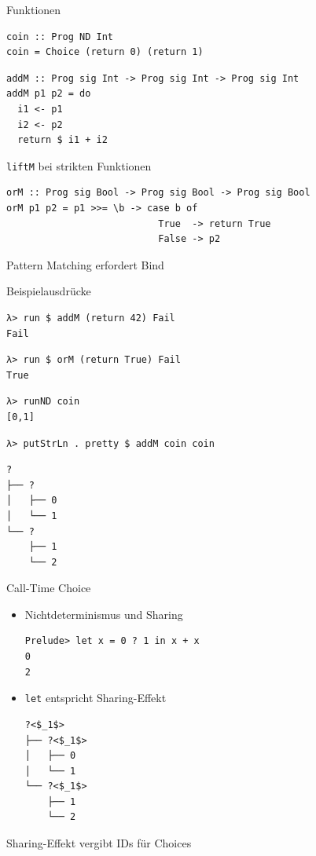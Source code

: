 \documentclass{beamer}
\newcommand{\haskellinline}[1]{\texttt{#1}}
\begin{document}
\begin{frame}[fragile]{Funktionen}
\begin{verbatim}
coin :: Prog ND Int
coin = Choice (return 0) (return 1)
\end{verbatim}
\pause
\begin{verbatim}
addM :: Prog sig Int -> Prog sig Int -> Prog sig Int
addM p1 p2 = do
  i1 <- p1
  i2 <- p2
  return $ i1 + i2
\end{verbatim}
\MVRightArrow{} \haskellinline{liftM} bei strikten Funktionen
\pause
\begin{verbatim}
orM :: Prog sig Bool -> Prog sig Bool -> Prog sig Bool
orM p1 p2 = p1 >>= \b -> case b of
                           True  -> return True
                           False -> p2
\end{verbatim}
\MVRightArrow{} Pattern Matching erfordert Bind
\end{frame}
\begin{frame}[fragile]{Beispielausdrücke}
\begin{verbatim}
λ> run $ addM (return 42) Fail
Fail
\end{verbatim}
\begin{verbatim}
λ> run $ orM (return True) Fail
True
\end{verbatim}
\begin{verbatim}
λ> runND coin
[0,1]
\end{verbatim}
\pause
\begin{verbatim}
λ> putStrLn . pretty $ addM coin coin
\end{verbatim}
\vspace*{-3pt}
\begin{verbatim}
?
├── ?
│   ├── 0
│   └── 1
└── ?
    ├── 1
    └── 2
\end{verbatim}
\end{frame}

\begin{frame}[fragile]{Call-Time Choice}
\begin{itemize}
\item Nichtdeterminismus und \alert{Sharing}
\begin{verbatim}
Prelude> let x = 0 ? 1 in x + x
0
2
\end{verbatim}
\item \haskellinline{let} entspricht Sharing-Effekt
\begin{verbatim}
?<$_1$>
├── ?<$_1$>
│   ├── 0
│   └── 1
└── ?<$_1$>
    ├── 1
    └── 2
\end{verbatim}
\end{itemize}
\MVRightArrow{} Sharing-Effekt vergibt \alert{IDs} für Choices
\end{frame}
\end{document}
